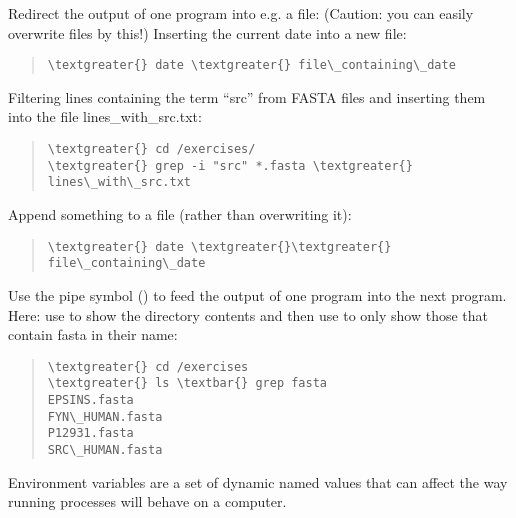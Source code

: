 \documentclass[letterpaper,10pt,english]{sphinxmanual}
\begin{document}
Redirect the output of one program into e.g. a file: (Caution: you can easily overwrite files by this!)
Inserting the current date into a new file:
\begin{quote}

\begin{Verbatim}[commandchars=\\\{\}]
\textgreater{} date \textgreater{} file\_containing\_date
\end{Verbatim}
\end{quote}

Filtering lines containing the term “src” from FASTA files and inserting them into the file lines\_with\_src.txt:
\begin{quote}

\begin{Verbatim}[commandchars=\\\{\}]
\textgreater{} cd /exercises/
\textgreater{} grep -i "src" *.fasta \textgreater{} lines\_with\_src.txt
\end{Verbatim}
\end{quote}

Append something to a file (rather than overwriting it):
\begin{quote}

\begin{Verbatim}[commandchars=\\\{\}]
\textgreater{} date \textgreater{}\textgreater{} file\_containing\_date
\end{Verbatim}
\end{quote}

Use the \index{\textbar{}}\textbar{} pipe symbol (\code{\textbar{}}) to feed the output of one program into the next program.
Here: use  to show the directory contents and then use  to only show those that contain fasta in their name:
\begin{quote}

\begin{Verbatim}[commandchars=\\\{\}]
\textgreater{} cd /exercises
\textgreater{} ls \textbar{} grep fasta
EPSINS.fasta
FYN\_HUMAN.fasta
P12931.fasta
SRC\_HUMAN.fasta
\end{Verbatim}
\end{quote}

Environment variables are a set of dynamic named values that can affect the way running processes will behave on a computer.
\end{document}
